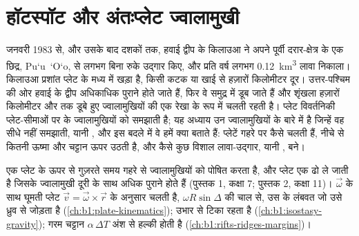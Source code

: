 \chapter{हॉटस्पॉट और अंतःप्लेट ज्वालामुखी}\label{ch:b1:hotspots}

जनवरी 1983 से, और उसके बाद दशकों तक, हवाई द्वीप के किलाउआ ने अपने पूर्वी दरार-क्षेत्र के एक छिद्र, Pu\textquoteleft u~\textquoteleft O\textquoteleft o, से लगभग बिना रुके उद्गार किए, और प्रति वर्ष लगभग \qty{0.12}{km^3} लावा निकाला। किलाउआ प्रशांत प्लेट के मध्य में खड़ा है, किसी कटक या खाई से हज़ारों किलोमीटर दूर। उत्तर-पश्चिम की ओर हवाई के द्वीप अधिकाधिक पुराने होते जाते हैं, फिर वे समुद्र में डूब जाते हैं और शृंखला हज़ारों किलोमीटर और तक डूबे हुए ज्वालामुखियों की एक रेखा के रूप में चलती रहती है।
प्लेट विवर्तनिकी प्लेट-सीमाओं पर के ज्वालामुखियों को समझाती है; यह अध्याय उन ज्वालामुखियों के बारे में है जिन्हें वह सीधे नहीं समझाती, यानी , और इस बदले में वे हमें क्या बताते हैं: प्लेटें गहरे  पर कैसे चलती हैं, नीचे से कितनी ऊष्मा और चट्टान ऊपर उठती है, और कैसे कुछ विशाल लावा-उद्गार, यानी , बने।

\begin{recall}
एक  प्लेट के ऊपर से गुज़रते समय गहरे  से ज्वालामुखियों को पोषित करता है, और प्लेट एक  ढो ले जाती है जिसके ज्वालामुखी दूरी के साथ अधिक पुराने होते हैं (पुस्तक 1, कक्षा 7; पुस्तक 2, कक्षा 11)।  $\vec\omega$ के साथ घूमती प्लेट $\vec v = \vec\omega\times\vec r$ के अनुसार चलती है, $\omega R\sin\Delta$ की चाल से, उस  के लंबवत जो उसे ध्रुव से जोड़ता है (\cref{ch:b1:plate-kinematics}); उभार  से टिका रहता है (\cref{ch:b1:isostasy-gravity}); गरम चट्टान $\alpha\,\Delta T$ अंश से हल्की होती है (\cref{ch:b1:rifts-ridges-margins})।
\end{recall}

